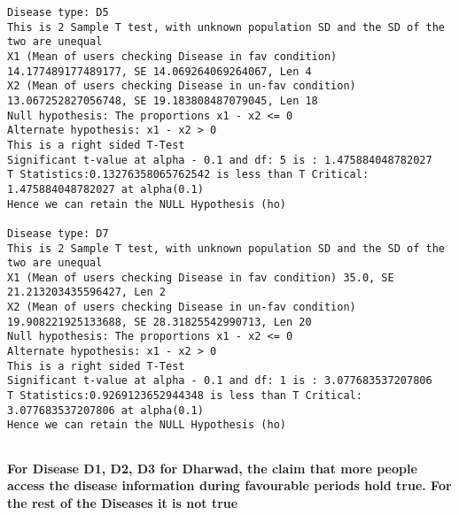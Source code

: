 \documentclass[11pt]{article}
\begin{document}
\begin{Verbatim}[commandchars=\\\{\}]
Disease type: D5
This is 2 Sample T test, with unknown population SD and the SD of the two are unequal
X1 (Mean of users checking Disease in fav condition) 14.177489177489177, SE 14.069264069264067, Len 4
X2 (Mean of users checking Disease in un-fav condition) 13.067252827056748, SE 19.183808487079045, Len 18
Null hypothesis: The proportions x1 - x2 <= 0
Alternate hypothesis: x1 - x2 > 0
This is a right sided T-Test
Significant t-value at alpha - 0.1 and df: 5 is : 1.475884048782027
T Statistics:0.13276358065762542 is less than T Critical: 1.475884048782027 at alpha(0.1)
Hence we can retain the NULL Hypothesis (ho)

Disease type: D7
This is 2 Sample T test, with unknown population SD and the SD of the two are unequal
X1 (Mean of users checking Disease in fav condition) 35.0, SE 21.213203435596427, Len 2
X2 (Mean of users checking Disease in un-fav condition) 19.908221925133688, SE 28.31825542990713, Len 20
Null hypothesis: The proportions x1 - x2 <= 0
Alternate hypothesis: x1 - x2 > 0
This is a right sided T-Test
Significant t-value at alpha - 0.1 and df: 1 is : 3.077683537207806
T Statistics:0.9269123652944348 is less than T Critical: 3.077683537207806 at alpha(0.1)
Hence we can retain the NULL Hypothesis (ho)


    \end{Verbatim}

    \textbf{For Disease D1, D2, D3 for Dharwad, the claim that more people
access the disease information during favourable periods hold true. For
the rest of the Diseases it is not true}
\end{document}
